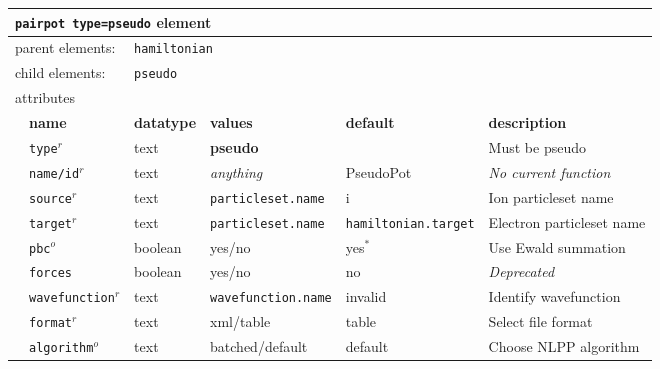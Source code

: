 \FloatBarrier
\begin{table}[h]
\begin{center}
\begin{tabularx}{\textwidth}{l l l l l l }
\hline
\multicolumn{6}{l}{\texttt{pairpot type=pseudo} element} \\
\hline
\multicolumn{2}{l}{parent elements:} & \multicolumn{4}{l}{\texttt{hamiltonian}}\\
\multicolumn{2}{l}{child  elements:} & \multicolumn{4}{l}{\texttt{pseudo}}\\
\multicolumn{2}{l}{attributes}  & \multicolumn{4}{l}{}\\
   &   \bfseries name     & \bfseries datatype & \bfseries values & \bfseries default   & \bfseries description \\
   & \texttt{type}$^r$    &  text              & \textbf{pseudo} &                      & Must be pseudo         \\
   & \texttt{name/id}$^r$ &  text              & \textit{anything}&  PseudoPot          & \textit{No current function}\\
   & \texttt{source}$^r$  &  text              & \texttt{particleset.name} &  i                  & Ion particleset name\\
   & \texttt{target}$^r$  &  text              & \texttt{particleset.name} &\texttt{hamiltonian.target}& Electron particleset name  \\
   & \texttt{pbc}$^o$     &  boolean           & yes/no           & yes$^*$             & Use Ewald summation  \\
   & \texttt{forces}      &  boolean           & yes/no           & no                  & \textit{Deprecated}             \\
   &\texttt{wavefunction}$^r$ &  text          & \texttt{wavefunction.name}& invalid    & Identify wavefunction \\
   &   \texttt{format}$^r$    &  text          & xml/table        & table               & Select file format   \\
   & \texttt{algorithm}$^o$   &  text          & batched/default  & default             & Choose NLPP algorithm \\
  \hline
\end{tabularx}
\end{center}
\end{table}
\FloatBarrier


